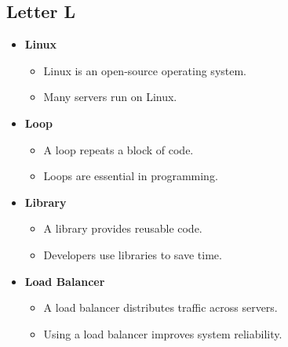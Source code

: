     \subsection{Letter L}
    \begin{itemize}
        \item \textbf{Linux}
        \begin{itemize}
            \item Linux is an open-source operating system.
            \item Many servers run on Linux.
        \end{itemize}
        \item \textbf{Loop}
        \begin{itemize}
            \item A loop repeats a block of code.
            \item Loops are essential in programming.
        \end{itemize}
        \item \textbf{Library}
        \begin{itemize}
            \item A library provides reusable code.
            \item Developers use libraries to save time.
        \end{itemize}
        \item \textbf{Load Balancer}
        \begin{itemize}
            \item A load balancer distributes traffic across servers.
            \item Using a load balancer improves system reliability.
        \end{itemize}
    \end{itemize}
